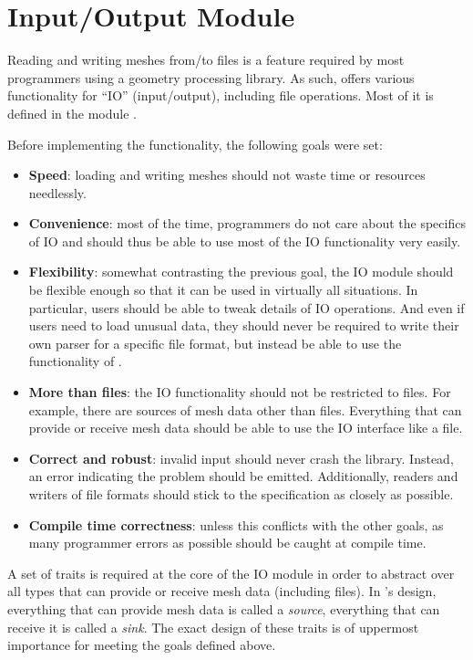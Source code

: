 \section{Input/Output Module}
\label{chap:io}

Reading and writing meshes from/to files is a feature required by most programmers using a geometry processing library.
As such,  offers various functionality for \enquote{IO} (input/output), including file operations.
Most of it is defined in the module .

Before implementing the functionality, the following goals were set:

\begin{itemize}
  \item \textbf{Speed}: loading and writing meshes should not waste time or resources needlessly.
  \item \textbf{Convenience}: most of the time, programmers do not care about the specifics of IO and should thus be able to use most of the IO functionality very easily.
  \item \textbf{Flexibility}: somewhat contrasting the previous goal, the IO module should be flexible enough so that it can be used in virtually all situations.
  In particular, users should be able to tweak details of IO operations.
  And even if users need to load unusual data, they should never be required to write their own parser for a specific file format, but instead be able to use the functionality of .
  \item \textbf{More than files}: the IO functionality should not be restricted to files.
  For example, there are sources of mesh data other than files.
  Everything that can provide or receive mesh data should be able to use the IO interface like a file.
  \item \textbf{Correct and robust}: invalid input should never crash the library.
  Instead, an error indicating the problem should be emitted.
  Additionally, readers and writers of file formats should stick to the specification as closely as possible.
  \item \textbf{Compile time correctness}: unless this conflicts with the other goals, as many programmer errors as possible should be caught at compile time.
\end{itemize}

\vfill
A set of traits is required at the core of the IO module in order to abstract over all types that can provide or receive mesh data (including files).
In 's design, everything that can provide mesh data is called a \emph{source}, everything that can receive it is called a \emph{sink}.
The exact design of these traits is of uppermost importance for meeting the goals defined above.

